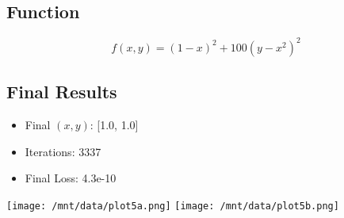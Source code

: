 \documentclass{article}
\begin{document}
\subsection*{Function}
\[
f(x, y) = (1 - x)^2 + 100(y - x^2)^2
\]
\subsection*{Final Results}
\begin{itemize}
    \item Final $(x, y)$: [1.0, 1.0]
    \item Iterations: 3337
    \item Final Loss: 4.3e-10
\end{itemize}
\texttt{[image: /mnt/data/plot5a.png]}
\texttt{[image: /mnt/data/plot5b.png]}
\end{document}
